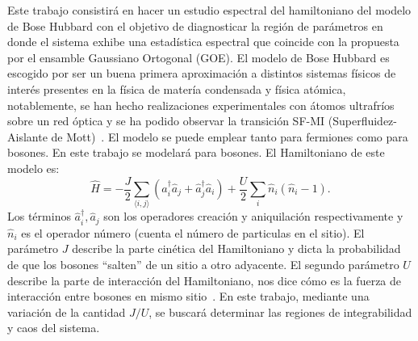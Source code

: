 \documentclass[spanish,titlepage,table]{practicas}
\begin{document}
Este trabajo consistirá en hacer un estudio espectral del hamiltoniano del modelo de Bose Hubbard 
con el objetivo de diagnosticar la región de parámetros en donde el sistema exhibe una estadística espectral 
que coincide con la propuesta por el ensamble Gaussiano Ortogonal (GOE). El modelo de Bose Hubbard es escogido por ser un buena primera aproximación a distintos sistemas físicos de interés presentes en la física de matería condensada y física atómica, notablemente, 
se han hecho realizaciones experimentales con átomos ultrafríos sobre un red óptica y se ha podido observar la transición SF-MI (Superfluidez-Aislante de Mott)~\cite{Zhang2010}. 
El modelo se puede emplear tanto para fermiones como para bosones. En este trabajo se modelará para bosones. El Hamiltoniano de este modelo es:
\begin{equation}
\hat{H}
= -\frac{J}{2} \sum_{\langle i,j\rangle} \!\left(\hat{a}_i^{\dagger}\hat{a}_j + \hat{a}_j^{\dagger}\hat{a}_i\right)
+ \frac{U}{2}\sum_{i}\hat{n}_i(\hat{n}_i - 1).
\end{equation}
Los términos $\hat{a}_i^{\dagger},\hat{a}_j$ son los operadores creación y aniquilación respectivamente y $\hat{n}_i$ es el operador número (cuenta el número de particulas en el sitio).
El parámetro $J$ describe la parte cinética del Hamiltoniano y dicta la probabilidad de que los bosones ``salten'' de un sitio a otro adyacente. El segundo parámetro $U$ describe la parte de interacción del Hamiltoniano, nos dice cómo  
es la fuerza de interacción entre bosones en mismo sitio~\cite{Zhang2010}. 
En este trabajo, mediante una variación de la cantidad $J/U$, se buscará determinar las regiones de integrabilidad y caos del sistema.
\end{document}

